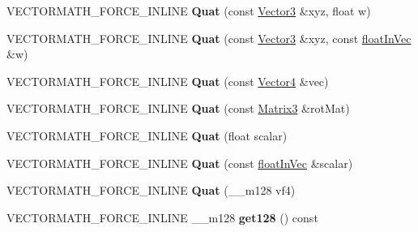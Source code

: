 \begin{DoxyCompactItemize}
V\+E\+C\+T\+O\+R\+M\+A\+T\+H\+\_\+\+F\+O\+R\+C\+E\+\_\+\+I\+N\+L\+I\+NE {\bfseries Quat} (const \hyperlink{classVectormath_1_1Aos_1_1Vector3}{Vector3} \&xyz, float w)
\item 
\mbox{\label{classVectormath_1_1Aos_1_1Quat_a579880f622f65e2e6cf6e65ca3f12794}} 
V\+E\+C\+T\+O\+R\+M\+A\+T\+H\+\_\+\+F\+O\+R\+C\+E\+\_\+\+I\+N\+L\+I\+NE {\bfseries Quat} (const \hyperlink{classVectormath_1_1Aos_1_1Vector3}{Vector3} \&xyz, const \hyperlink{classVectormath_1_1floatInVec}{float\+In\+Vec} \&w)
\item 
\mbox{\label{classVectormath_1_1Aos_1_1Quat_a60356545117438d21499d0afd7d689da}} 
V\+E\+C\+T\+O\+R\+M\+A\+T\+H\+\_\+\+F\+O\+R\+C\+E\+\_\+\+I\+N\+L\+I\+NE {\bfseries Quat} (const \hyperlink{classVectormath_1_1Aos_1_1Vector4}{Vector4} \&vec)
\item 
\mbox{\label{classVectormath_1_1Aos_1_1Quat_a6ee788faa20607fe4c9823ef2065c689}} 
V\+E\+C\+T\+O\+R\+M\+A\+T\+H\+\_\+\+F\+O\+R\+C\+E\+\_\+\+I\+N\+L\+I\+NE {\bfseries Quat} (const \hyperlink{classVectormath_1_1Aos_1_1Matrix3}{Matrix3} \&rot\+Mat)
\item 
\mbox{\label{classVectormath_1_1Aos_1_1Quat_ab3080be7cc946bf0fe1388155d3df50a}} 
V\+E\+C\+T\+O\+R\+M\+A\+T\+H\+\_\+\+F\+O\+R\+C\+E\+\_\+\+I\+N\+L\+I\+NE {\bfseries Quat} (float scalar)
\item 
\mbox{\label{classVectormath_1_1Aos_1_1Quat_a121d29b49a881a553de03b7df07e0c6f}} 
V\+E\+C\+T\+O\+R\+M\+A\+T\+H\+\_\+\+F\+O\+R\+C\+E\+\_\+\+I\+N\+L\+I\+NE {\bfseries Quat} (const \hyperlink{classVectormath_1_1floatInVec}{float\+In\+Vec} \&scalar)
\item 
\mbox{\label{classVectormath_1_1Aos_1_1Quat_af62400c0f8225b7d63abd214f63afb88}} 
V\+E\+C\+T\+O\+R\+M\+A\+T\+H\+\_\+\+F\+O\+R\+C\+E\+\_\+\+I\+N\+L\+I\+NE {\bfseries Quat} (\+\_\+\+\_\+m128 vf4)
\item 
\mbox{\label{classVectormath_1_1Aos_1_1Quat_ab463a6812298a674271ade56343660e6}} 
V\+E\+C\+T\+O\+R\+M\+A\+T\+H\+\_\+\+F\+O\+R\+C\+E\+\_\+\+I\+N\+L\+I\+NE \+\_\+\+\_\+m128 {\bfseries get128} () const

\end{DoxyCompactItemize}
